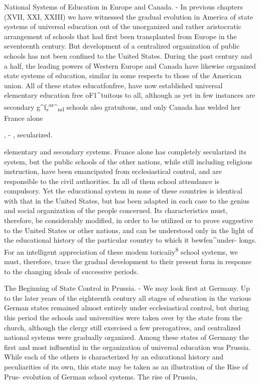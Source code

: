 \documentclass[]{book}
\begin{document}
National Systems of Education in Europe and Canada. - In previous chapters (XVII, XXI, XXIII) we have witnessed the gradual evolution in America of state systems of universal education out of the unorganized and rather aristocratic arrangement of schools that had first been transplanted from Europe in the seventeenth century. But development of a centralized organization of public schools has not been confined to the United States. During the past century and a half, the leading powers of Western Europe and Canada have likewise organized state systems of education, similar in some respects to those of the American union. All of these states educatfonfree, have now established universal elementary education free oF1\^{}tuitous to all, although as yet in few instances are secondary g\^{}f\textsubscript{s}\textsuperscript{ar}\^{}\textsubscript{nd} schools also gratuitous, and only Canada has welded her France alone

, - , secularized.

elementary and secondary systems. France alone has completely secularized its system, but the public schools of the other nations, while still including religious instruction, have been emancipated from ecclesiastical control, and are responsible to the civil authorities. In all of them school attendance is compulsory. Yet the educational system in none of these countries is identical with that in the United States, but has been adapted in each case to the genius and social organization of the people concerned. Its characteristics must, therefore, be considerably modified, in order to be utilized or to prove suggestive to the United States or other nations, and can be understood only in the light of the educational history of the particular country to which it bewfen\^{}under- longs. For an intelligent appreciation of these modem toricaiiy\textsuperscript{8} school systems, we must, therefore, trace the gradual development to their present form in response to the changing ideals of successive periods.

The Beginning of State Control in Prussia. - We may look first at Germany. Up to the later years of the eighteenth century all stages of education in the various German states remained almost entirely under ecclesiastical control, but during this period the schools and universities were taken over by the state from the church, although the clergy still exercised a few prerogatives, and centralized national systems were gradually organized. Among these states of Germany the first and most influential in the organization of universal education was Prussia. While each of the others is characterized by an educational history and peculiarities of its own, this state may be taken as an illustration of the Rise of Prus- evolution of German school systems. The rise of Prussia,
\end{document}
